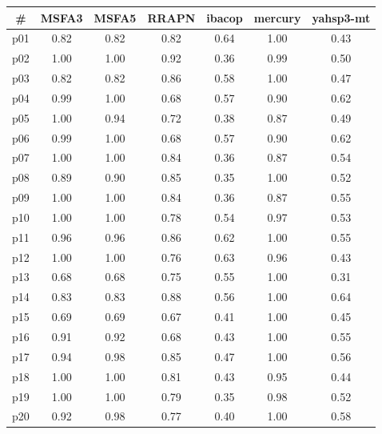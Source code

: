 \begin{tabular}{ccccccc}
\toprule
\textbf{\#} & \textbf{MSFA3} & \textbf{MSFA5} & \textbf{RRAPN} & \textbf{ibacop} & \textbf{mercury} & \textbf{yahsp3-mt}\\
\midrule
p01 & 0.82 & 0.82 & 0.82 & 0.64 & 1.00 & 0.43\\
p02 & 1.00 & 1.00 & 0.92 & 0.36 & 0.99 & 0.50\\
p03 & 0.82 & 0.82 & 0.86 & 0.58 & 1.00 & 0.47\\
p04 & 0.99 & 1.00 & 0.68 & 0.57 & 0.90 & 0.62\\
p05 & 1.00 & 0.94 & 0.72 & 0.38 & 0.87 & 0.49\\
p06 & 0.99 & 1.00 & 0.68 & 0.57 & 0.90 & 0.62\\
p07 & 1.00 & 1.00 & 0.84 & 0.36 & 0.87 & 0.54\\
p08 & 0.89 & 0.90 & 0.85 & 0.35 & 1.00 & 0.52\\
p09 & 1.00 & 1.00 & 0.84 & 0.36 & 0.87 & 0.55\\
p10 & 1.00 & 1.00 & 0.78 & 0.54 & 0.97 & 0.53\\
p11 & 0.96 & 0.96 & 0.86 & 0.62 & 1.00 & 0.55\\
p12 & 1.00 & 1.00 & 0.76 & 0.63 & 0.96 & 0.43\\
p13 & 0.68 & 0.68 & 0.75 & 0.55 & 1.00 & 0.31\\
p14 & 0.83 & 0.83 & 0.88 & 0.56 & 1.00 & 0.64\\
p15 & 0.69 & 0.69 & 0.67 & 0.41 & 1.00 & 0.45\\
p16 & 0.91 & 0.92 & 0.68 & 0.43 & 1.00 & 0.55\\
p17 & 0.94 & 0.98 & 0.85 & 0.47 & 1.00 & 0.56\\
p18 & 1.00 & 1.00 & 0.81 & 0.43 & 0.95 & 0.44\\
p19 & 1.00 & 1.00 & 0.79 & 0.35 & 0.98 & 0.52\\
p20 & 0.92 & 0.98 & 0.77 & 0.40 & 1.00 & 0.58\\
\bottomrule
\end{tabular}

